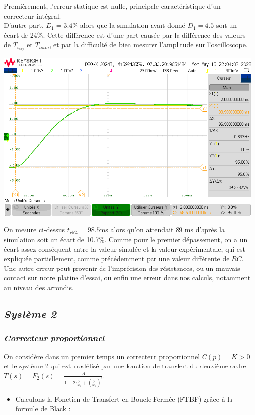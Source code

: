 \documentclass[12pt]{article}
\begin{document}
Premièrement, l'erreur statique est nulle, principale caractéristique d'un correcteur intégral.
\\D'autre part, $D_1 = 3.4\%$ alors que la simulation avait donné $D_1 = 4.5$ soit un écart de 24$\%$. Cette différence est d'une part causée par la différence des valeurs de $T_{i_{exp}}$ et $T_{i{sim}}$, et par la difficulté de bien mesurer l'amplitude sur l'oscilloscope.
\begin{center}
    \includegraphics[width = 16 cm]{TP3/Syst_1/I/tr5-syst1-ti=0.07789.png}
\end{center}
\normalsize On mesure ci-dessus $t_{r5\%} = 98.5$ms alors qu'on attendait 89 ms d'après la simulation soit un écart de 10.7$\%$. Comme pour le premier dépassement, on a un écart assez conséquent entre la valeur simulée et la valeur expérimentale, qui est expliquée partiellement, comme précédemment par une valeur différente de $RC$. Une autre erreur peut provenir de l'imprécision des résistances, ou un mauvais contact sur notre platine d'essai, ou enfin une erreur dans nos calculs, notamment au niveau des arrondis.
\subsection{\itshape Système 2}
\subsubsection{\underline{\itshape \bf Correcteur proportionnel}}
On considère dans un premier temps un correcteur proportionnel $C(p) = K > 0$ et le système 2 qui est modélisé par une fonction de transfert du deuxième ordre $T(s) = F_2(s) = \frac{A}{1 + 2z\frac{p}{\omega_0} + (\frac{p}{\omega_0})^2}$.
\begin{itemize}
    \item Calculons la Fonction de Transfert en Boucle Fermée (FTBF) grâce à la formule de Black : 
\end{itemize}
\end{document}
